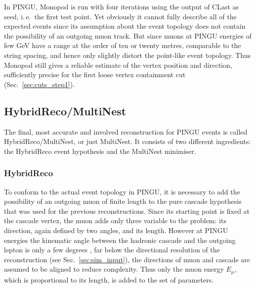 In PINGU, Monopod is run with four iterations using the output of CLast as
seed, i.\,e.\ the first test point. Yet obviously it cannot fully describe
all of the expected events since its assumption about the event topology does
not contain the possibility of an outgoing muon track. But since muons at PINGU
energies of few GeV have a range at the order of ten or twenty metres,
comparable to the string spacing, and hence only slightly distort the point-like
event topology. Thus Monopod still gives a reliable estimate of the vertex
position and direction, sufficiently precise for the first loose vertex
containment cut (Sec.~\ref{sec:cuts_step1}).

\subsection{HybridReco/MultiNest}
\label{sec:reco_multinest}

The final, most accurate and involved reconstruction for PINGU events is called
HybridReco/MultiNest, or just MultiNest. It consists of two different
ingredients: the HybridReco event hypothesis and the MultiNest minimiser.

\subsubsection{HybridReco}

To conform to the actual event topology in PINGU, it is necessary to add the
possibility of an outgoing muon of finite length to the pure cascade hypothesis
that was used for the previous reconstructions. Since its starting point is
fixed at the cascade vertex, the muon adds only three variable to the problem:
its direction, again defined by two angles, and its length. However at PINGU
energies the kinematic angle between the hadronic cascade and the outgoing
lepton is only a few degrees \cite{NuScattAng}, far below the directional
resolution of the reconstruction (see Sec.~\ref{sec:sim_input}), the directions
of muon and cascade are assumed to be aligned to reduce complexity. Thus only
the muon energy $E_\mu$, which is proportional to its length, is added to the
set of parameters.

